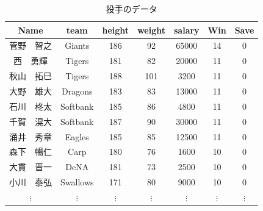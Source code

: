 \begin{table}[ht]
	\caption{投手のデータ}
	\centering
	\begin{tabular}[t]{ccccccc}
		\hline
		Name     & team     & height   & weight   & salary   & Win      & Save     \\
		\hline
		菅野　智之    & Giants   & 186      & 92       & 65000    & 14       & 0        \\
		西　勇輝     & Tigers   & 181      & 82       & 20000    & 11       & 0        \\
		秋山　拓巳    & Tigers   & 188      & 101      & 3200     & 11       & 0        \\
		大野　雄大    & Dragons  & 183      & 83       & 13000    & 11       & 0        \\
		石川　柊太    & Softbank & 185      & 86       & 4800     & 11       & 0        \\
		千賀　滉大    & Softbank & 187      & 90       & 30000    & 11       & 0        \\
		涌井　秀章    & Eagles   & 185      & 85       & 12500    & 11       & 0        \\
		森下　暢仁    & Carp     & 180      & 76       & 1600     & 10       & 0        \\
		大貫　晋一    & DeNA     & 181      & 73       & 2500     & 10       & 0        \\
		小川　泰弘    & Swallows & 171      & 80       & 9000     & 10       & 0        \\
		$\vdots$ & $\vdots$ & $\vdots$ & $\vdots$ & $\vdots$ & $\vdots$ & $\vdots$ \\
		\hline
	\end{tabular}
	\label{tbl::09_01}
\end{table}
